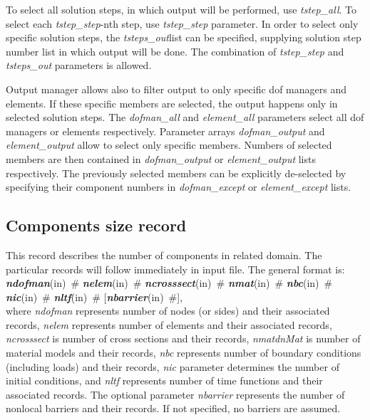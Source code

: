 \documentclass[draft]{article}
\newcommand{\param}[1]{{\em #1}}
\newcommand{\keywordnotype}[1]{\mbox{{\it{\bf{#1}}}}}
\newcommand{\keyword}[2]{\mbox{{\keywordnotype{#1}\tiny (#2)}}}
\newcommand{\field}[2]{\mbox{\keyword{#1}{#2}~\#}}
\newcommand{\optField}[2]{\mbox{[\field{#1}{#2}]}}
\begin{document}
To select all solution steps, in which output will be performed, use
\param{tstep\_all}. To select each \param{tstep\_step}-nth step, use
\param{tstep\_step} parameter. In order to select only specific
solution steps, the \param{tsteps\_out}list can be specified,
supplying solution step number list in which output will be done.
The combination of \param{tstep\_step} and
\param{tsteps\_out} parameters is allowed. 

Output manager allows also to filter output to only specific dof
managers and elements. If these specific members are selected, the
output happens only in selected solution steps. 
The \param{dofman\_all} and \param{element\_all} parameters select
all dof managers or elements respectively. Parameter arrays
\param{dofman\_output} and \param{element\_output} allow to select
only specific members. Numbers of selected members are then contained
in \param{dofman\_output} or \param{element\_output} lists
respectively. The previously selected members can be explicitly
de-selected by specifying their component numbers in \param{dofman\_except} or
\param{element\_except} lists.



\subsection{Components size record}
\label{_ComponentsSizeRecord}
This record describes the number of components in related domain. The
particular records will follow immediately in input file. The general format is:\\
\field{ndofman}{in}  \field{nelem}{in}
\field{ncrosssect}{in}  \field{nmat}{in}  \field{nbc}{in} \field{nic}{in}
\field{nltf}{in} \optField{nbarrier}{in},\\

where \param{ndofman} represents number of nodes (or sides) and their associated  records,
\param{nelem} represents number of elements and their associated records, \param{ncrosssect} is
number of cross sections and their records, \param{nmatdnMat}{} is number of material
models and their records, \param{nbc}{} represents number of boundary
conditions (including loads) and their
records, \param{nic} parameter determines the number of initial
conditions, and \param{nltf} represents number of time functions and
their associated records. The optional parameter \param{nbarrier}
represents the number of nonlocal barriers and their records. If not
specified, no barriers are assumed.
\end{document}
